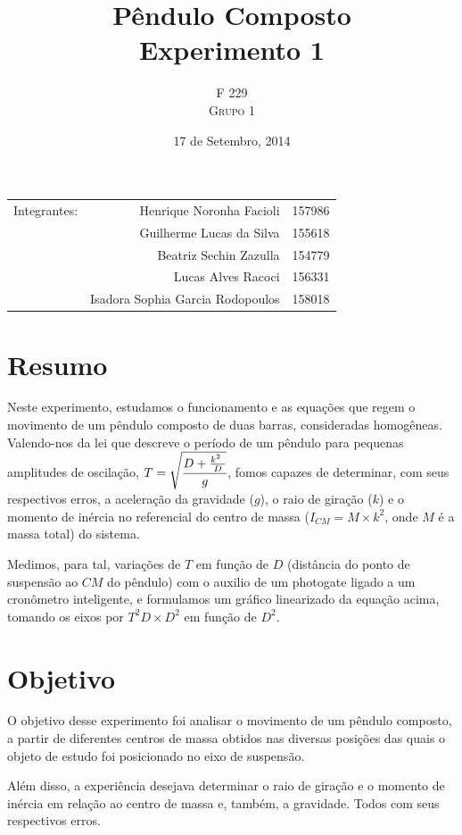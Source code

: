 \documentclass{article}
\title{P\^endulo Composto \\ Experimento 1} %
\author{F 229 \\ \textsc{Grupo 1}}
\date{17 de Setembro, 2014}
\begin{document}
\maketitle

\begin{center}
	\begin{tabular}{l r l}
		Integrantes: & Henrique Noronha Facioli & 157986 \\
		& Guilherme Lucas da Silva & 155618 \\
		& Beatriz Sechin Zazulla & 154779 \\
		& Lucas Alves Racoci & 156331 \\
		& Isadora Sophia Garcia Rodopoulos & 158018 \\
	\end{tabular}
\end{center}


\section{Resumo}
Neste experimento, estudamos o funcionamento e as equações que regem o movimento de um pêndulo composto de duas barras, consideradas homogêneas. Valendo-nos da lei que descreve o período de um pêndulo para pequenas amplitudes de oscilação, $T = \sqrt{ \cfrac { D + \frac{ k^2\ } {D} } {g} }$, fomos capazes de determinar, com seus respectivos erros, a aceleração da gravidade ($g$), o raio de giração ($k$) e o momento de inércia no referencial do centro de massa ($I_{CM} = M \times k^2$, onde $M$ é a massa total) do sistema. 

Medimos, para tal, variações de $T$ em função de $D$ (distância do ponto de suspensão ao $CM$ do pêndulo) com o auxilio de um photogate ligado a um cronômetro inteligente, e formulamos um gráfico linearizado da equação acima, tomando os eixos por $T^2D \times D^2$ em função de $D^2$. 


\section{Objetivo}
O objetivo desse experimento foi analisar o movimento de um pêndulo composto, a partir de diferentes centros de massa obtidos nas diversas posições das quais o objeto de estudo foi posicionado no eixo de suspensão.

Além disso, a experiência desejava determinar o raio de giração e o momento de inércia em relação ao centro de massa e, também, a gravidade. Todos com seus respectivos erros.
\end{document}
